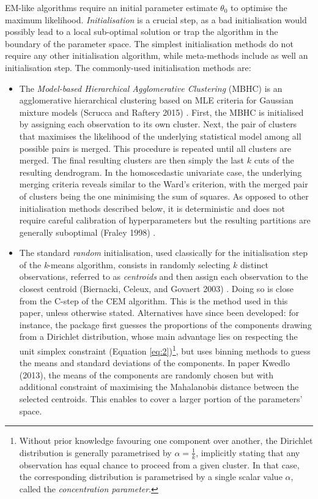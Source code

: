 EM-like algorithms require an initial parameter estimate \(\theta_0\) to
optimise the maximum likelihood. \emph{Initialisation} is a crucial step, as
a bad initialisation would possibly lead to a local sub-optimal solution
or trap the algorithm in the boundary of the parameter space. The
simplest initialisation methods do not require any other initialisation
algorithm, while meta-methods include as well an initialisation step.
The commonly-used initialisation methods are:

\begin{itemize}
\item
  The \emph{Model-based Hierarchical Agglomerative Clustering} (MBHC) is
  an agglomerative hierarchical clustering based on MLE criteria for
  Gaussian mixture models (Scrucca and Raftery 2015) . First, the MBHC is
  initialised by assigning each observation to its own cluster. Next,
  the pair of clusters that maximises the likelihood of the underlying
  statistical model among all possible pairs is merged. This procedure
  is repeated until all clusters are merged. The final resulting
  clusters are then simply the last \(k\) cuts of the resulting
  dendrogram. In the homoscedastic univariate case, the underlying
  merging criteria reveals similar to the Ward's criterion, with the
  merged pair of clusters being the one minimising the sum of squares.
  As opposed to other initialisation methods described below, it is
  deterministic and does not require careful calibration of
  hyperparameters but the resulting partitions are generally
  suboptimal (Fraley 1998) .
\item
  The standard \emph{random} initialisation, used classically for the
  initialisation step of the \emph{k}-means algorithm, consists in randomly
  selecting \(k\) distinct observations, referred to as \emph{centroids} and
  then assign each observation to the closest centroid
  (Biernacki, Celeux, and Govaert 2003) . Doing so is close from the C-step of the CEM algorithm.
  This is the method used in this paper, unless otherwise stated. Alternatives have since been developed: for instance, the package  first guesses the proportions of the components drawing from a Dirichlet distribution, whose main advantage lies on respecting the unit simplex constraint (Equation \eqref{eq:2})\footnote{Without prior knowledge favouring one component over another, the Dirichlet distribution is generally parametrised by \(\alpha=\frac{1}{k}\), implicitly stating that any observation has equal chance to proceed from a given cluster. In that case, the corresponding distribution is parametrised by a single scalar value \(\alpha\), called the \emph{concentration parameter}.}, but uses binning methods to guess the means and standard deviations of the components. In paper Kwedlo (2013), the means of the components are randomly chosen but with additional constraint of maximising the Mahalanobis distance between the selected centroids. This enables to cover a larger portion of the parameters' space.

\end{itemize}
